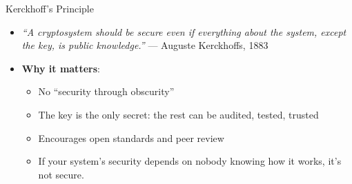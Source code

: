 \documentclass[aspectratio=169, lualatex, handout]{beamer}
\begin{document}
	\begin{frame}{Kerckhoff's Principle}
		\begin{itemize}
			\item \textit{``A cryptosystem should be secure even if everything about
				the system, except the key, is public knowledge.''} — Auguste Kerckhoffs,
				1883 \pause

			\item \textbf{Why it matters}:
				\begin{itemize}
					\pause

					\item No ``security through obscurity'' \pause

					\item The key is the only secret: the rest can be audited, tested,
						trusted \pause

					\item Encourages open standards and peer review \pause

					\item If your system's security depends on nobody knowing how it works,
						it's not secure.
				\end{itemize}
		\end{itemize}
	\end{frame}
\end{document}
